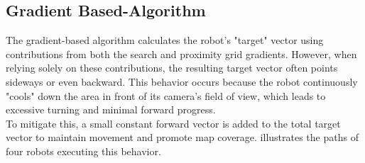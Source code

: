 \subsection{Gradient Based-Algorithm}
The gradient-based algorithm calculates the robot's "target" vector using contributions from both the search and proximity grid gradients. However, when relying solely on these contributions, the resulting target vector often points sideways or even backward. This behavior occurs because the robot continuously "cools" down the area in front of its camera's field of view, which leads to excessive turning and minimal forward progress. \\

To mitigate this, a small constant forward vector is added to the total target vector to maintain movement and promote map coverage.  illustrates the paths of four robots executing this behavior.

